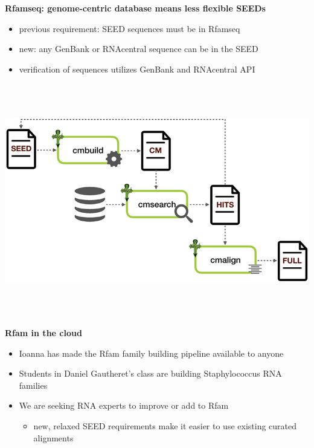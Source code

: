 \documentclass[landscape]{slides}
\begin{document}
\begin{slide}
\begin{center}
  \textbf{Rfamseq: genome-centric database means less flexible SEEDs}
  \begin{itemize}  
  \item previous requirement: SEED sequences must be in Rfamseq
  \item new: any GenBank or RNAcentral sequence can be in the SEED
  \item verification of sequences utilizes GenBank and RNAcentral API
  \end{itemize}
\vspace{0.5in}
\includegraphics[height=4in]{figs/kalvari18-rfam-schema}
\end{center}    
\vfill
\tiny {}
\end{slide}
\begin{slide}
\begin{center}
  \textbf{Rfam in the cloud}
  \small
  \begin{itemize}  
  \item Ioanna has made the Rfam family building pipeline available to anyone
  \item Students in Daniel Gautheret's class are building Staphylococcus RNA families
  \item We are seeking RNA experts to improve or add to Rfam
    \begin {itemize}
      \item new, relaxed SEED requirements make it easier to use existing curated alignments 
    \end{itemize}
  \end{itemize}
\end{center}    
\vfill
\end{slide}
\end{document}
